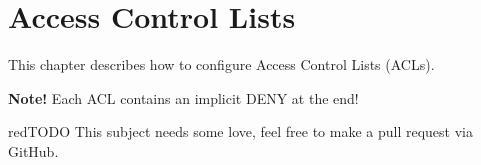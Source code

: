 \section{Access Control Lists}
This chapter describes how to configure Access Control Lists (ACLs).
\begin{tcolorbox}
\textbf{Note!} Each ACL contains an implicit DENY at the end!
\end{tcolorbox}
\begin{textbox}{red}{TODO}
This subject needs some love, feel free to make a pull request via GitHub.
\end{textbox}
